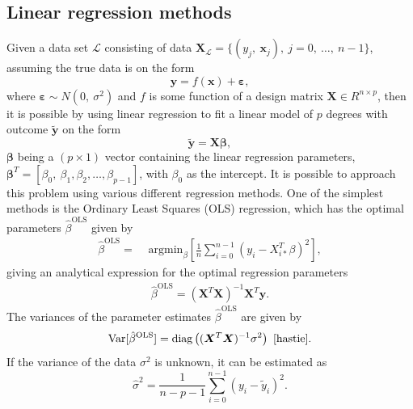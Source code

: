 \documentclass[a4paper, 10pt]{article}
\begin{document}
\begin{multicols}{2}
\subsection{Linear regression methods}
\label{subsec:LinReg}
Given a data set $\mathcal{L}$ consisting of data $\bm{X}_\mathcal{L} = \{(y_j	,\ \bm{x}_j),\ j=0,\ \dots,\ n-1\}$, assuming the true data is on the form
\begin{equation}
\bm{y} = f(\bm{x})+ \bm{\varepsilon} ,
\end{equation}
where $\bm{\varepsilon} \sim N(0,\ \sigma ^2)$ and $f$ is some function of a design matrix $\bm{X}\in R^{n\times p}$, then it is possible by using linear regression to fit a linear model of $p$ degrees with outcome $\bm{\tilde{y}}$ on the form
\begin{equation}
\bm{\tilde{y}} = \bm{X}\bm{\beta},  \label{eq:y=Xbeta}
\end{equation}
$\bm{\beta}$ being a $(p\times 1)$ vector containing the linear regression parameters, $\bm{\beta}^T=[\beta_0,\ \beta_1, \beta_2,\dots,\beta_{p-1}]$, with $\beta_0$ as the intercept.
It is possible to approach this problem using various different regression methods. One of the simplest methods is the Ordinary Least Squares (OLS) regression, which has the optimal parameters $\hat{\beta}^\text{OLS}$ given by
\begin{align}
    \hat{\beta}^\text{OLS} =& \text{ argmin}_{ {\beta} } \left[ \frac{1}{n} \sum_{i=0}^{n-1} (y_i - X_{i*}^T \beta)^2 \right],
    \label{eq:argminbeta_OLS}
\end{align}
giving an analytical expression for the optimal regression parameters
\begin{align}
    \hat{\beta}^{\text{OLS}} = (\bm{X}^T\bm{X})^{-1} \bm{X}^T \bm{y}.
    \label{eq:beta_OLS}
\end{align}
The variances of the parameter estimates $ \hat{\beta}^{\text{OLS}} $ are given by
\begin{equation}
\label{eq:betavariance}
\text{Var} [\hat{\beta}^{\text{OLS}} ] = \text{diag}\left((\bm{X}^T\bm{X})^{-1}\sigma^2\right) \ \cite{hastie}.
\end{equation}
If the variance of the data $\sigma^2$ is unknown, it can be estimated as
\begin{equation}
\label{eq:variance}
\hat{\sigma}^2  = \frac{1}{n-p-1}\sum_{i=0}^{n-1}(y_i-\tilde{y}_i)^2.
\end{equation}


\end{multicols}
\end{document}

